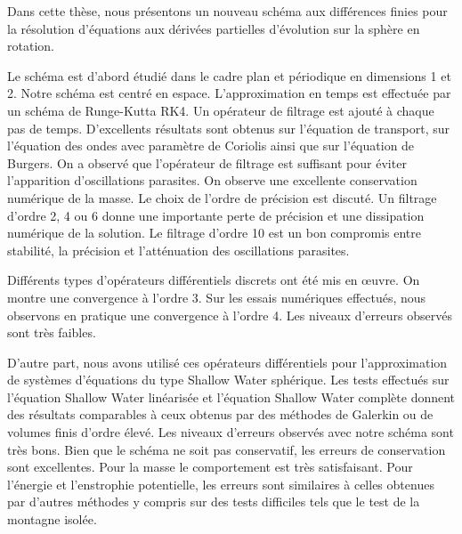 
Dans cette thèse, nous présentons un nouveau schéma aux différences finies pour la résolution d'équations aux dérivées partielles d'évolution sur la sphère en rotation.

Le schéma est d'abord étudié dans le cadre plan et périodique en dimensions 1 et 2. Notre schéma est centré en espace. L'approximation en temps est effectuée par un schéma de Runge-Kutta RK4. Un opérateur de filtrage est ajouté à chaque pas de temps. D'excellents résultats sont obtenus sur l'équation de transport, sur l'équation des ondes avec paramètre de Coriolis ainsi que sur l'équation de Burgers. On a observé que l'opérateur de filtrage est suffisant pour éviter l'apparition d'oscillations parasites. On observe une excellente conservation numérique de la masse. Le choix de l'ordre de précision est discuté. Un filtrage d'ordre 2, 4 ou 6 donne une importante perte de précision et une dissipation numérique de la solution. Le filtrage d'ordre 10 est un bon compromis entre stabilité, la précision et l'atténuation des oscillations parasites.

Différents types d'opérateurs différentiels discrets ont été mis en œuvre. On montre une convergence à l'ordre 3. Sur les essais numériques effectués, nous observons en pratique une convergence à l'ordre 4. Les niveaux d'erreurs observés sont très faibles. 


D'autre part, nous avons utilisé ces opérateurs différentiels pour l'approximation de systèmes d'équations du type Shallow Water sphérique. Les tests effectués sur l'équation Shallow Water linéarisée et l'équation Shallow Water complète donnent des résultats comparables à ceux obtenus par des méthodes de Galerkin ou de volumes finis d'ordre élevé. Les niveaux d'erreurs observés avec notre schéma sont très bons. Bien que le schéma ne soit pas conservatif, les erreurs de conservation sont excellentes. Pour la masse le comportement est très satisfaisant. Pour l'énergie et l'enstrophie potentielle, les erreurs sont similaires à celles obtenues par d'autres méthodes y compris sur des tests difficiles tels que le test de la montagne isolée.

